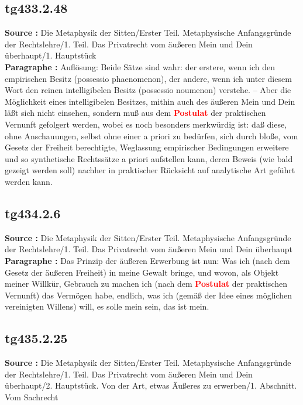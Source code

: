 \documentclass[a4paper,12pt,twoside]{book}
\newcommand{\match}[1]{\textcolor{red}{\textbf{#1}}}
\begin{document}
	\subsection*{tg433.2.48} 
	\textbf{Source : }Die Metaphysik der Sitten/Erster Teil. Metaphysische Anfangsgründe der Rechtslehre/1. Teil. Das Privatrecht vom äußeren Mein und Dein überhaupt/1. Hauptstück\\  
	
	\textbf{Paragraphe : }
	Auflösung: Beide Sätze sind wahr: der erstere, wenn ich den empirischen Besitz (possessio phaenomenon), der andere, wenn ich unter diesem Wort den reinen intelligibelen Besitz (possessio noumenon) verstehe. – Aber die Möglichkeit eines intelligibelen Besitzes, mithin auch des äußeren Mein und Dein läßt sich nicht einsehen,  sondern muß aus dem \match{Postulat} der praktischen Vernunft gefolgert werden, wobei es noch besonders merkwürdig ist: daß diese, ohne Anschauungen, selbst ohne einer a priori zu bedürfen, sich durch bloße, vom Gesetz der Freiheit berechtigte, Weglassung empirischer Bedingungen erweitere und so synthetische Rechtssätze a priori aufstellen kann, deren Beweis (wie bald gezeigt werden soll) nachher in praktischer Rücksicht auf analytische Art geführt werden kann. 
	
	\subsection*{tg434.2.6} 
	\textbf{Source : }Die Metaphysik der Sitten/Erster Teil. Metaphysische Anfangsgründe der Rechtslehre/1. Teil. Das Privatrecht vom äußeren Mein und Dein überhaupt\\  
	
	\textbf{Paragraphe : }Das Prinzip der äußeren Erwerbung ist nun: Was ich (nach dem Gesetz der äußeren Freiheit) in meine Gewalt bringe, und wovon, als Objekt meiner Willkür, Gebrauch zu machen ich (nach dem \match{Postulat} der praktischen Vernunft) das Vermögen habe, endlich, was ich (gemäß der Idee eines möglichen vereinigten Willens) will, es solle mein sein, das ist mein. 
	
	\subsection*{tg435.2.25} 
	\textbf{Source : }Die Metaphysik der Sitten/Erster Teil. Metaphysische Anfangsgründe der Rechtslehre/1. Teil. Das Privatrecht vom äußeren Mein und Dein überhaupt/2. Hauptstück. Von der Art, etwas Äußeres zu erwerben/1. Abschnitt. Vom Sachrecht\\  
	
\end{document}
